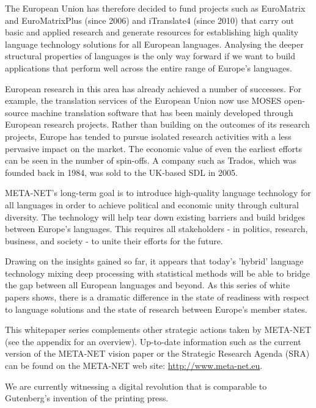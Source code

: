 \documentclass[]{../../metanetpaper}
\begin{document}
\begin{Parallel}[c]{70mm}{70mm}
{The European Union has therefore decided to fund projects such as EuroMatrix
and EuroMatrixPlus (since 2006) and iTranslate4 (since 2010) that carry out
basic and applied research and generate resources for establishing high quality
language technology solutions for all European languages. Analysing the deeper
structural properties of languages is the only way forward if we want to build
applications that perform well across the entire range of Europe’s languages.

European research in this area has already achieved a number of successes. For
example, the translation services of the European Union now use MOSES
open-source machine translation software that has been mainly developed through
European research projects. Rather than building on the outcomes of its
research projects, Europe has tended to pursue isolated research activities
with a less pervasive impact on the market. The economic value of even the
earliest efforts can be seen in the number of spin-offs. A company such as
Trados, which was founded back in 1984, was sold to the UK-based SDL in 2005.


META-NET’s long-term goal is to introduce high-quality language
technology for all languages in order to achieve political and
economic unity through cultural diversity. The technology will help
tear down existing barriers and build bridges between Europe’s
languages. This requires all stakeholders - in politics, research,
business, and society - to unite their efforts for the future.

Drawing on the insights gained so far, it appears that today’s
'hybrid' language technology mixing deep processing with statistical
methods will be able to bridge the gap between all European languages
and beyond. As this series of white papers shows, there is a dramatic
difference in the state of readiness with respect to language
solutions and the state of research between Europe’s member states.

This whitepaper series complements other strategic actions taken by
META-NET (see the appendix for an overview). Up-to-date information
such as the current version of the META-NET vision paper \cite{Vision}
or the Strategic Research Agenda (SRA) can be found on the META-NET
web site: \url{http://www.meta-net.eu}.

We are currently witnessing a digital revolution that is comparable to
Gutenberg’s invention of the printing press.
}


\end{Parallel}
\end{document}
